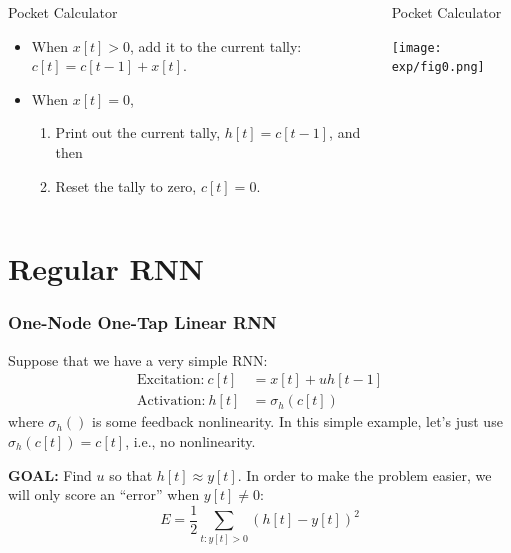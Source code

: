 \documentclass{beamer}
\begin{document}
\begin{frame}  
  \begin{columns}
    \column{2in}
    \begin{block}{Pocket Calculator}
      \begin{itemize}
      \item When $x[t]>0$, add it to the current tally: $c[t]=c[t-1]+x[t]$.
      \item When $x[t]=0$,
        \begin{enumerate}
        \item Print out the current tally, $h[t]=c[t-1]$, and then
        \item Reset the tally to zero, $c[t]=0$.
        \end{enumerate}
      \end{itemize}
    \end{block}
    \column{2.25in}
    \begin{block}{Pocket Calculator}
      \centerline{\texttt{[image: exp/fig0.png]}}
    \end{block}
    \end{columns}
\end{frame}
  
\section[RNN]{Regular RNN}
\setcounter{subsection}{1}

\begin{frame}
  \frametitle{One-Node One-Tap Linear RNN}
  Suppose that we have a very simple RNN:
  \begin{align*}
    \mbox{Excitation:}~c[t] &= x[t]+uh[t-1]\\
    \mbox{Activation:}~h[t] &= \sigma_h\left(c[t]\right)
  \end{align*}
  where $\sigma_h()$ is some feedback nonlinearity.  In this simple
  example, let's just use $\sigma_h(c[t])=c[t]$, i.e., no
  nonlinearity. 

  {\bf GOAL:} Find $u$ so that $h[t]\approx
  y[t]$.  In order to make the problem easier, we will only score an
  ``error'' when $y[t]\ne 0$:
  \[
  E = \frac{1}{2}\sum_{t:y[t]>0} \left(h[t]-y[t]\right)^2
  \]
\end{frame}
\end{document}
